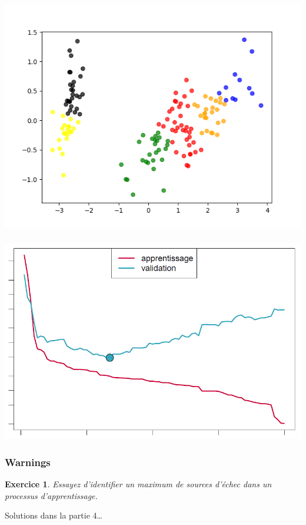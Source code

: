 \documentclass[11pt]{beamer}
\newenvironment{slide}[1]{%
\begin{frame}[environment=slide]
\frametitle{#1}
}{%
\end{frame}
}
\newtheorem{exercice}{Exercice}
\begin{document}
\begin{slide}{}

\includegraphics[scale=0.5]{iris_surapprentissage}

\end{slide}

\begin{slide}{}

\includegraphics[scale=0.3]{testvalidation}

\end{slide}

\begin{slide}{Warnings}

\begin{exercice}
Essayez d'identifier un maximum de sources d'échec dans un processus d'apprentissage.
\end{exercice}

Solutions dans la partie 4\ldots

\end{slide}
\end{document}

